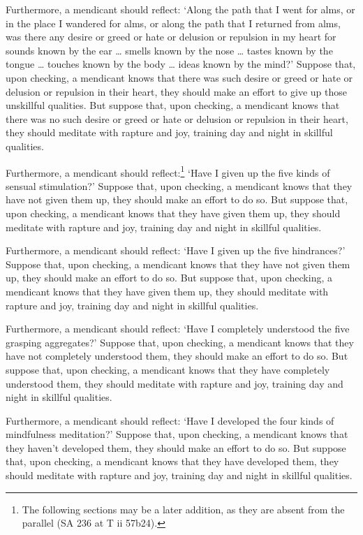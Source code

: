 \documentclass[12pt,openany]{book}%
\begin{document}
Furthermore, a mendicant should reflect: ‘Along the path that I went for alms, or in the place I wandered for alms, or along the path that I returned from alms, was there any desire or greed or hate or delusion or repulsion in my heart for sounds known by the ear … smells known by the nose … tastes known by the tongue … touches known by the body … ideas known by the mind?’ Suppose that, upon checking, a mendicant knows that there was such desire or greed or hate or delusion or repulsion in their heart, they should make an effort to give up those unskillful qualities. But suppose that, upon checking, a mendicant knows that there was no such desire or greed or hate or delusion or repulsion in their heart, they should meditate with rapture and joy, training day and night in skillful qualities. 

Furthermore, a mendicant should reflect:\footnote{The following sections may be a later addition, as they are absent from the parallel (SA 236 at T ii 57b24). } ‘Have I given up the five kinds of sensual stimulation?’ Suppose that, upon checking, a mendicant knows that they have not given them up, they should make an effort to do so. But suppose that, upon checking, a mendicant knows that they have given them up, they should meditate with rapture and joy, training day and night in skillful qualities. 

Furthermore, a mendicant should reflect: ‘Have I given up the five hindrances?’ Suppose that, upon checking, a mendicant knows that they have not given them up, they should make an effort to do so. But suppose that, upon checking, a mendicant knows that they have given them up, they should meditate with rapture and joy, training day and night in skillful qualities. 

Furthermore, a mendicant should reflect: ‘Have I completely understood the five grasping aggregates?’ Suppose that, upon checking, a mendicant knows that they have not completely understood them, they should make an effort to do so. But suppose that, upon checking, a mendicant knows that they have completely understood them, they should meditate with rapture and joy, training day and night in skillful qualities. 

Furthermore, a mendicant should reflect: ‘Have I developed the four kinds of mindfulness meditation?’ Suppose that, upon checking, a mendicant knows that they haven’t developed them, they should make an effort to do so. But suppose that, upon checking, a mendicant knows that they have developed them, they should meditate with rapture and joy, training day and night in skillful qualities. 
\end{document}
